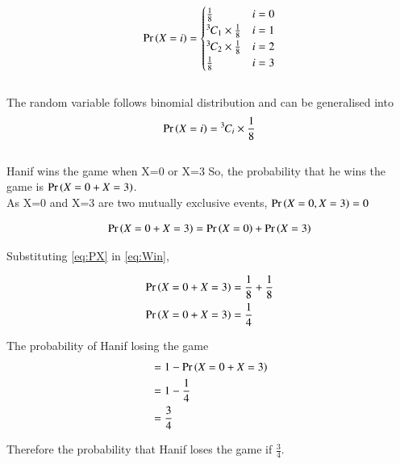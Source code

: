 \documentclass[journal,12pt]{IEEEtran}
\begin{document}
\begin{align}
   \Pr\left(X=i\right)=
      \begin{cases}
            \frac{1}{8} &  i=0  \\
            {{}^{3}\mkern-1muC_{1}}\times\frac{1}{8} &  i=1  \\
            {{}^{3}\mkern-1muC_{2}}\times\frac{1}{8} &  i=2  \\
            \frac{1}{8} &  i=3
      \end{cases}
  \label{eq:PX}    
\end{align}
\\
The random variable follows binomial distribution and can be generalised into 
\begin{align}
  \Pr\left(X=i\right)={{}^{3}\mkern-1muC_{i}}\times\frac{1}{8}
\end{align}
\\
Hanif wins the game when X=0 or X=3
So, the probability that he wins the game is $\Pr\left(X=0 + X=3\right)$.\\

As X=0 and X=3 are two mutually exclusive events, $\Pr\left(X=0,X=3\right)=0$

\begin{align}
  \Pr\left(X=0 + X=3\right)=\Pr\left(X=0\right)+\Pr\left(X=3\right)\nonumber\\
 \label{eq:Win}
\end{align}

Substituting \eqref{eq:PX} in \eqref{eq:Win}, 

\begin{align}
  \Pr\left(X=0 + X=3\right)&=\frac{1}{8}+\frac{1}{8}\nonumber\\
  \Pr\left(X=0 + X=3\right)&=\frac{1}{4}\nonumber\\ 
\end{align}

The probability of Hanif losing the game 
\begin{align}
   &=1-\Pr\left(X=0 + X=3\right)\nonumber\\
   &=1-\frac{1}{4}\nonumber\\
   &=\frac{3}{4}\nonumber\\
\end{align}

Therefore the probability that Hanif loses the game if $\frac{3}{4}$.
\end{document}
